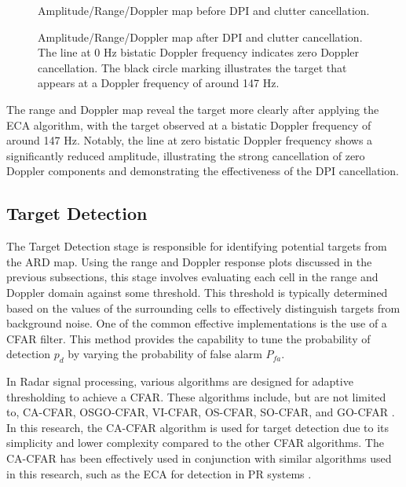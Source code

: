 \begin{figure}[H]
    \centering
    
    \caption{Amplitude/Range/Doppler map before DPI and clutter cancellation.}
    \label{fig:ardDPIbefore}
\end{figure}
\begin{figure}[H]
    \centering
    
    \caption{Amplitude/Range/Doppler map after DPI and clutter cancellation. The line at 0 Hz bistatic Doppler frequency indicates zero Doppler cancellation. The black circle marking illustrates the  target that  appears at a Doppler frequency of around 147 Hz.}
    \label{fig:ardDPIAfter}
\end{figure}

The range and Doppler map reveal the target more clearly after applying the \ac{ECA} algorithm, with the target observed at a bistatic Doppler frequency of around 147 Hz. Notably, the line at zero bistatic Doppler frequency shows a significantly reduced amplitude, illustrating the strong cancellation of zero Doppler components and demonstrating the effectiveness of the \ac{DPI} cancellation.

\subsection{Target Detection}
The Target Detection stage is responsible for identifying potential targets from the \ac{ARD} map. Using the range and Doppler response plots discussed in the previous subsections, this stage involves evaluating each cell in the range and Doppler domain against some threshold. This threshold is typically determined based on the values of the surrounding cells to effectively distinguish targets from background noise. One of the common effective implementations is the use of a \ac{CFAR} filter. This method provides the capability to tune the probability of detection \(p_d\) by varying the probability of false alarm \(P_{fa}\).


In \ac{Radar} signal processing, various algorithms are designed for adaptive thresholding to achieve a \ac{CFAR}. 
These algorithms include, but are not limited to, \ac{CA-CFAR}, \ac{OSGO-CFAR}, \ac{VI-CFAR}, \ac{OS-CFAR}, \ac{SO-CFAR}, and \ac{GO-CFAR} \cite{hatem2018comparative}. In this research, the \ac{CA-CFAR} algorithm is used for target detection due to its simplicity and lower complexity compared to the other \ac{CFAR} algorithms. The \ac{CA-CFAR} has been effectively used in conjunction with similar algorithms used in this research, such as the \ac{ECA} for detection in \ac{PR} systems \cite{Colone2009,Golabi2013}.


